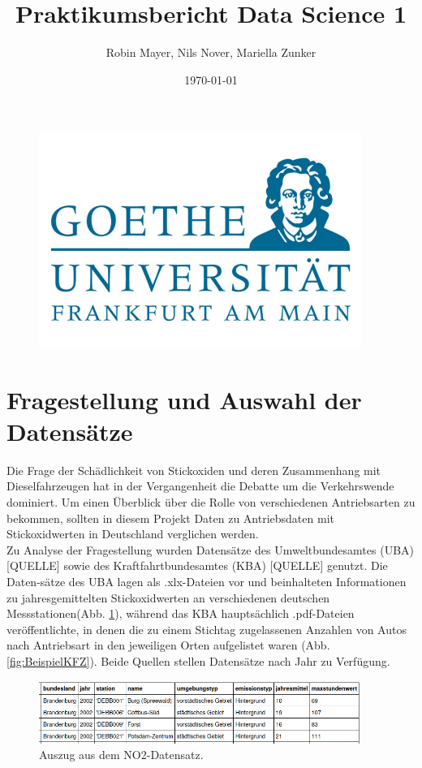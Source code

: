 \documentclass[11pt,a4paper,oneside,german]{article}
\title{Praktikumsbericht Data Science 1}
\author{Robin Mayer, Nils Nover, Mariella Zunker}
\date{\today}
\begin{document}
	\maketitle
	
	\begin{figure}[h]
		\centering
		\includegraphics[width=10.5cm]{uniemblem.jpg}		
	\end{figure}
	
	\newpage
	
	\tableofcontents
	
	\section{Fragestellung und Auswahl der Datensätze}
	
	Die Frage der Schädlichkeit von Stickoxiden und deren Zusammenhang mit Dieselfahrzeugen hat in der Vergangenheit die Debatte um die Verkehrswende dominiert. Um einen Überblick über die Rolle von verschiedenen Antriebsarten zu bekommen, sollten in diesem Projekt Daten zu Antriebsdaten mit Stickoxidwerten in Deutschland verglichen werden. \\
	Zu Analyse der Fragestellung wurden Datensätze des Umweltbundesamtes (UBA) [QUELLE] sowie des Kraftfahrtbundesamtes (KBA) [QUELLE] genutzt. Die Daten-sätze des UBA lagen als .xlx-Dateien vor und beinhalteten Informationen zu jahresgemittelten Stickoxidwerten an verschiedenen deutschen Messstationen(Abb. \ref{fig:BeispielNO2}), während das KBA hauptsächlich .pdf-Dateien veröffentlichte, in denen die zu einem Stichtag zugelassenen Anzahlen von Autos nach Antriebsart in den jeweiligen Orten aufgelistet waren (Abb. \ref{fig:BeispielKFZ}). Beide Quellen stellen Datensätze nach Jahr zu Verfügung.
	
	\begin{figure}[h!]
		\centering
		\includegraphics[width=10.5cm]{BeispielNO2.png}
		\caption{Auszug aus dem NO2-Datensatz.}
		\label{fig:BeispielNO2}
	\end{figure}
	
\end{document}
